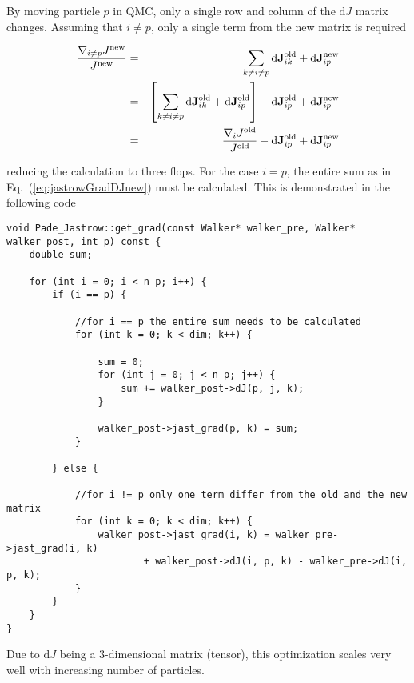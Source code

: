 By moving particle $p$ in QMC, only a single row and column of the $\mathrm{d} J$ matrix changes. Assuming that $i\ne p$, only a single term from the new matrix is required

\begin{eqnarray}
 \frac{\nabla_{i\ne p} J^\mathrm{new}}{J^\mathrm{new}} &=& \sum_{k \ne i \ne p} \mathrm{d}\mathbf{J}^\mathrm{old}_{ik} + \mathrm{d}\mathbf{J}^\mathrm{new}_{ip} \\
 &=& \left[\sum_{k \ne i \ne p} \mathrm{d}\mathbf{J}^\mathrm{old}_{ik} + \mathrm{d}\mathbf{J}^\mathrm{old}_{ip}\right] - \mathrm{d}\mathbf{J}^\mathrm{old}_{ip} + \mathrm{d}\mathbf{J}^\mathrm{new}_{ip} \\
 &=& \frac{\nabla_i J^\mathrm{old}}{J^\mathrm{old}} - \mathrm{d}\mathbf{J}^\mathrm{old}_{ip} + \mathrm{d}\mathbf{J}^\mathrm{new}_{ip}
\end{eqnarray}

reducing the calculation to three flops. For the case $i=p$, the entire sum as in Eq.~(\ref{eq:jastrowGradDJnew}) must be calculated. This is demonstrated in the following code

\vspace{0.5cm}
\begin{lstlisting}
void Pade_Jastrow::get_grad(const Walker* walker_pre, Walker* walker_post, int p) const {
    double sum;

    for (int i = 0; i < n_p; i++) {
        if (i == p) {
       
            //for i == p the entire sum needs to be calculated
            for (int k = 0; k < dim; k++) {

                sum = 0;
                for (int j = 0; j < n_p; j++) {
                    sum += walker_post->dJ(p, j, k);
                }

                walker_post->jast_grad(p, k) = sum;
            }
        
        } else {
       
            //for i != p only one term differ from the old and the new matrix
            for (int k = 0; k < dim; k++) {
                walker_post->jast_grad(i, k) = walker_pre->jast_grad(i, k)
                        + walker_post->dJ(i, p, k) - walker_pre->dJ(i, p, k);
            }
        }
    }
}
\end{lstlisting}

Due to $\mathrm{d}J$ being a 3-dimensional matrix (tensor), this optimization scales very well with increasing number of particles.


